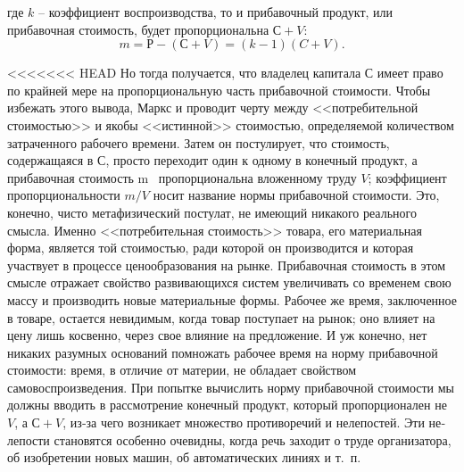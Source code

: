 \documentclass{book}
\begin{document}
где $k$ -- коэффициент воспроизводства, то и прибавочный продукт, или прибавочная стоимость, будет пропорциональ­на $С + V$:
\[
	m=Р-(С+V)=(k-1)(C+V).
\]

<<<<<<< HEAD
Но тогда получается, что владелец капитала С имеет право по крайней мере на пропорциональную часть прибавочной стои­мости. Чтобы избежать этого вывода, Маркс и проводит черту между <<потребительной стоимостью>> и якобы <<истинной>> стоимостью, определяемой количеством затраченного рабочего времени. Затем он постулирует, что стоимость, содержащаяся в $С$, просто переходит один к одному в конечный продукт, а прибавочная стоимость m  пропорциональна вложенному труду $V$; коэффициент пропорциональности $m/V$ носит назва­ние нормы прибавочной стоимости. Это, конечно, чисто мета­физический постулат, не имеющий никакого реального смысла. Именно <<потребительная стоимость>> товара, его материальная форма, является той стоимостью, ради которой он производит­ся и которая участвует в процессе ценообразования на рынке. Прибавочная стоимость в этом смысле отражает свойство раз­вивающихся систем увеличивать со временем свою массу и про­изводить новые материальные формы. Рабочее же время, заклю­ченное в товаре, остается невидимым, когда товар поступает на рынок; оно влияет на цену лишь косвенно, через свое влия­ние на предложение. И уж конечно, нет никаких разумных ос­нований помножать рабочее время на норму прибавочной сто­имости: время, в отличие от материи, не обладает свойством самовоспроизведения. При попытке вычислить норму приба­вочной стоимости мы должны вводить в рассмотрение конечный продукт, который пропорционален не $V$, а $С + V$, из‑за чего возникает множество противоречий и нелепостей. Эти не­лепости становятся особенно очевидны, когда речь заходит о труде организатора, об изобретении новых машин, об автоматических линиях и т.~п.
\end{document}
